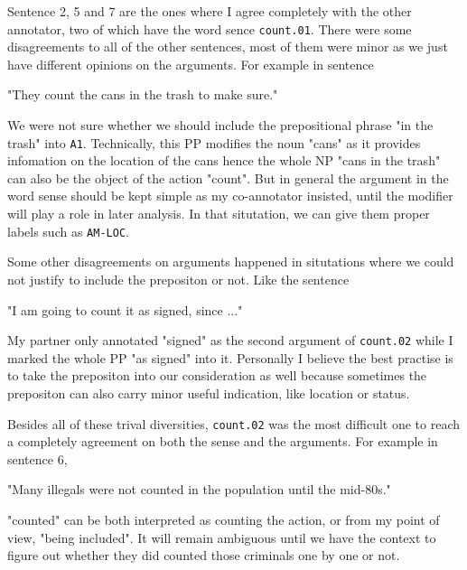 \documentclass[11pt]{article} %
\begin{document}
Sentence 2, 5 and 7 are the ones where I agree completely with the other annotator, two of which have the word sence \texttt{count.01}. There were some disagreements to all of the other sentences, most of them were minor as we just have different opinions on the arguments. For example in sentence

\begin{displayquote}
    "They count the cans in the trash to make sure."
\end{displayquote}

We were not sure whether we should include the prepositional phrase "in the trash" into \texttt{A1}. Technically, this PP modifies the noun "cans" as it provides infomation on the location of the cans hence the whole NP "cans in the trash" can also be the object of the action "count". But in general the argument in the word sense should be kept simple as my co-annotator insisted, until the modifier will play a role in later analysis. In that situtation, we can give them proper labels such as \texttt{AM-LOC}.

Some other disagreements on arguments happened in situtations where we could not justify to include the prepositon or not. Like the sentence

\begin{displayquote}
    "I am going to count it as signed, since ..."
\end{displayquote}

My partner only annotated "signed" as the second argument of \texttt{count.02} while I marked the whole PP "as signed" into it. Personally I believe the best practise is to take the prepositon into our consideration as well because sometimes the prepositon can also carry minor useful indication, like location or status.

Besides all of these trival diversities, \texttt{count.02} was the most difficult one to reach a completely agreement on both the sense and the arguments. For example in sentence 6,

\begin{displayquote}
    "Many illegals were not counted in the population until the mid-80s."
\end{displayquote}

"counted" can be both interpreted as counting the action, or from my point of view, "being included". It will remain ambiguous until we have the context to figure out whether they did counted those criminals one by one or not.

\printbibliography
\end{document}
